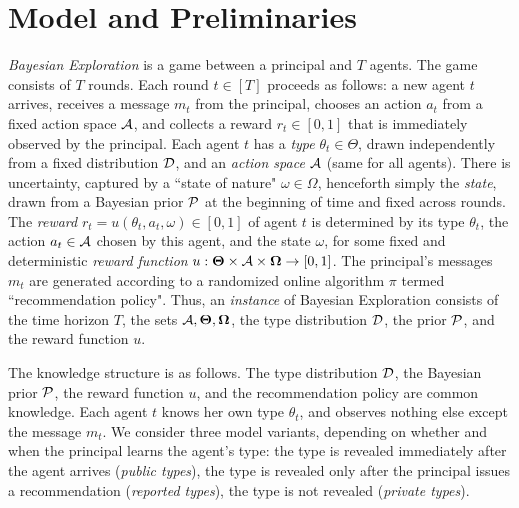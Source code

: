 \section{Model and Preliminaries}
\label{sec:model}


\emph{Bayesian Exploration} is a game between a principal and $T$ agents. The game consists of $T$ rounds. Each round $t\in [T]$ proceeds as follows: a new agent $t$ arrives, receives a message $m_t$ from the principal, chooses an action $a_t$ from a fixed action space $\mathcal{A}$, and collects a reward $r_t\in [0,1]$ that is immediately observed by the principal. Each agent $t$ has a {\em type} $\theta_t\in\varTheta$, drawn independently from a fixed distribution $\mathcal{D}$, and an {\em action space} $\mathcal{A}$ (same for all agents).  There is uncertainty, captured by a ``state of nature" $\omega\in \varOmega$, henceforth simply the \emph{state}, drawn from a Bayesian prior $\mathcal{P}$ at the beginning of time and fixed across rounds. The {\em reward} $r_t = u(\theta_t,a_t,\omega)\in[0,1]$ of agent $t$ is determined by its type $\theta_t$, the action $a_t\in\mathcal{A}$ chosen by this agent, and the state $\omega$, for some fixed and deterministic \emph{reward function}
$u:\bold{\Theta}\times \mathcal{A} \times \bold{\Omega} \to [0,1]$.
The principal's messages $m_t$ are generated according to a randomized online algorithm $\pi$ termed ``recommendation policy".
Thus, an {\em instance}
of Bayesian Exploration consists of the time horizon $T$, the sets $\mathcal{A},\bold{\Theta},\bold{\Omega}$,
the type distribution $\mathcal{D}$, the prior $\mathcal{P}$, and the reward function $u$.


The knowledge structure is as follows. The type distribution $\mathcal{D}$, the Bayesian prior $\mathcal{P}$, the reward function $u$, and the recommendation policy are common knowledge. Each agent $t$ knows her own type $\theta_t$, and observes nothing else except the message $m_t$.  We consider three model variants, depending on whether and when the principal learns the agent's type: the type is revealed immediately after the agent arrives (\emph{public types}), the type is revealed only after the principal issues a recommendation (\emph{reported types}), the type is not revealed (\emph{private types}).


